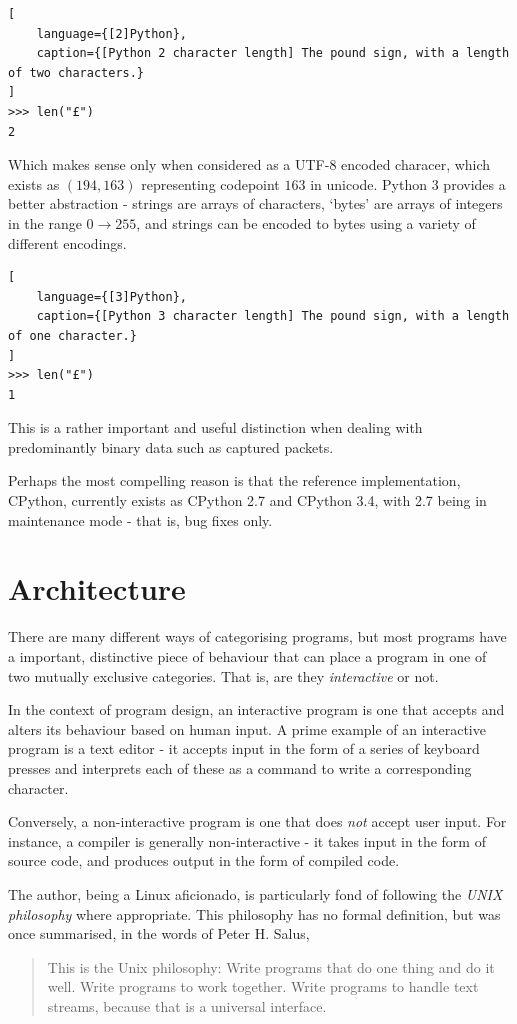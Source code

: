 \documentclass[10pt,a4paper,notitlepage,twoside]{report}
\begin{document}
\begin{lstlisting}[
    language={[2]Python},
    caption={[Python 2 character length] The pound sign, with a length of two characters.}
]
>>> len("£")
2
\end{lstlisting}

Which makes sense only when considered as a UTF-8 encoded characer, which exists as $(194, 163)$ representing codepoint $163$ in unicode.
Python 3 provides a better abstraction - strings are arrays of characters, `bytes' are arrays of integers in the range $0 \rightarrow 255$, and strings can be encoded to bytes using a variety of different encodings.

\begin{lstlisting}[
    language={[3]Python},
    caption={[Python 3 character length] The pound sign, with a length of one character.}
]
>>> len("£")
1
\end{lstlisting}

This is a rather important and useful distinction when dealing with predominantly binary data such as captured packets.

Perhaps the most compelling reason is that the reference implementation, CPython, currently exists as CPython 2.7 and CPython 3.4, with 2.7 being in maintenance mode\cite{cpy2maint} - that is, bug fixes only.

\section{Architecture}
There are many different ways of categorising programs, but most programs have a important, distinctive piece of behaviour that can place a program in one of two mutually exclusive categories. That is, are they \emph{interactive} or not.

In the context of program design, an interactive program is one that accepts and alters its behaviour based on human input.
A prime example of an interactive program is a text editor - it accepts input in the form of a series of keyboard presses and interprets each of these as a command to write a corresponding character.

Conversely, a non-interactive program is one that does \emph{not} accept user input. For instance, a compiler is generally non-interactive - it takes input in the form of source code, and produces output in the form of compiled code.

The author, being a Linux aficionado, is particularly fond of following the \emph{UNIX philosophy} where appropriate. This philosophy has no formal definition, but was once summarised, in the words of Peter H. Salus\cite{qcou},
\begin{quote}
This is the Unix philosophy: Write programs that do one thing and do it well. Write programs to work together. Write programs to handle text streams, because that is a universal interface.
\end{quote}
\end{document}
